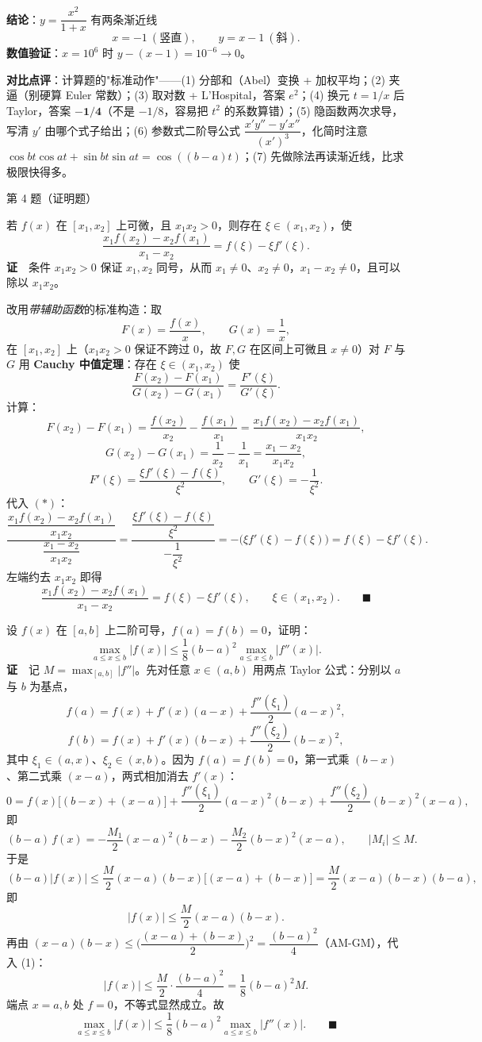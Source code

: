 \documentclass[10pt]{ctexart}
\newcommand{\Qhead}[2]{%
  \begin{tcolorbox}[enhanced,colback=graybg,colframe=acc,
    boxrule=0pt,leftrule=3pt,arc=2pt,top=3pt,bottom=3pt,left=8pt,right=8pt]
  {\heiti\color{acc}#1}\quad #2
  \end{tcolorbox}}
\begin{document}
\noindent\textbf{结论}：$y=\dfrac{x^2}{1+x}$ 有两条渐近线
\[
\boxed{x=-1\ (\text{竖直}),\qquad y=x-1\ (\text{斜}) .}
\]
\textbf{数值验证}：$x=10^6$ 时 $y-(x-1)=10^{-6}\to0$。

\begin{cmpbox}
\textbf{对比点评}：计算题的"标准动作"——(1) 分部和（Abel）变换 + 加权平均；(2) 夹逼（别硬算 Euler 常数）；(3) 取对数 + L'Hospital，答案 $e^2$；(4) 换元 $t=1/x$ 后 Taylor，答案 $\mathbf{-1/4}$（不是 $-1/8$，容易把 $t^2$ 的系数算错）；(5) 隐函数两次求导，写清 $y'$ 由哪个式子给出；(6) 参数式二阶导公式 $\dfrac{x'y''-y'x''}{(x')^3}$，化简时注意 $\cos bt\cos at+\sin bt\sin at=\cos((b-a)t)$；(7) 先做除法再读渐近线，比求极限快得多。
\end{cmpbox}

\Qhead{第 4 题（证明题）}{}

\quad 若 $f(x)$ 在 $[x_1,x_2]$ 上可微，且 $x_1x_2>0$，则存在 $\xi\in(x_1,x_2)$，使
\[
\frac{x_1f(x_2)-x_2f(x_1)}{x_1-x_2}=f(\xi)-\xi f'(\xi).
\]
\textbf{证}　条件 $x_1x_2>0$ 保证 $x_1,x_2$ 同号，从而 $x_1\neq0$、$x_2\neq0$，$x_1-x_2\neq0$，且可以除以 $x_1x_2$。

改用\emph{带辅助函数}的标准构造：取
\[
F(x)=\frac{f(x)}{x},
\qquad
G(x)=\frac1x ,
\]
在 $[x_1,x_2]$ 上（$x_1x_2>0$ 保证不跨过 $0$，故 $F,G$ 在区间上可微且 $x\neq0$）对 $F$ 与 $G$ 用 \textbf{Cauchy 中值定理}：存在 $\xi\in(x_1,x_2)$ 使
\[
\frac{F(x_2)-F(x_1)}{G(x_2)-G(x_1)}=\frac{F'(\xi)}{G'(\xi)} . \tag{$\ast$}
\]
计算：
\[
F(x_2)-F(x_1)=\frac{f(x_2)}{x_2}-\frac{f(x_1)}{x_1}
=\frac{x_1f(x_2)-x_2f(x_1)}{x_1x_2},
\]
\[
G(x_2)-G(x_1)=\frac1{x_2}-\frac1{x_1}=\frac{x_1-x_2}{x_1x_2},
\]
\[
F'(\xi)=\frac{\xi f'(\xi)-f(\xi)}{\xi^{2}},\qquad
G'(\xi)=-\frac1{\xi^{2}} .
\]
代入 $(\ast)$：
\[
\frac{\dfrac{x_1f(x_2)-x_2f(x_1)}{x_1x_2}}{\dfrac{x_1-x_2}{x_1x_2}}
=\frac{\dfrac{\xi f'(\xi)-f(\xi)}{\xi^2}}{-\dfrac{1}{\xi^2}}
=-\big(\xi f'(\xi)-f(\xi)\big)=f(\xi)-\xi f'(\xi) .
\]
左端约去 $x_1x_2$ 即得
\[
\frac{x_1f(x_2)-x_2f(x_1)}{x_1-x_2}=f(\xi)-\xi f'(\xi),
\qquad \xi\in(x_1,x_2). \qquad\blacksquare
\]

\quad 设 $f(x)$ 在 $[a,b]$ 上二阶可导，$f(a)=f(b)=0$，证明：
\[
\max_{a\le x\le b}|f(x)|\le\frac18(b-a)^{2}\max_{a\le x\le b}|f''(x)| .
\]
\textbf{证}　记 $M=\max_{[a,b]}|f''|$。先对任意 $x\in(a,b)$ 用两点 Taylor 公式：分别以 $a$ 与 $b$ 为基点，
\[
f(a)=f(x)+f'(x)(a-x)+\frac{f''(\xi_1)}{2}(a-x)^{2},
\]
\[
f(b)=f(x)+f'(x)(b-x)+\frac{f''(\xi_2)}{2}(b-x)^{2},
\]
其中 $\xi_1\in(a,x)$、$\xi_2\in(x,b)$。因为 $f(a)=f(b)=0$，第一式乘 $(b-x)$、第二式乘 $(x-a)$，两式相加消去 $f'(x)$：
\[
0=f(x)\big[(b-x)+(x-a)\big]+\frac{f''(\xi_1)}{2}(a-x)^{2}(b-x)+\frac{f''(\xi_2)}{2}(b-x)^{2}(x-a),
\]
即
\[
(b-a)\,f(x)
=-\frac{M_1}{2}(x-a)^{2}(b-x)-\frac{M_2}{2}(b-x)^{2}(x-a),\qquad |M_i|\le M .
\]
于是
\[
(b-a)|f(x)|\le\frac{M}{2}(x-a)(b-x)\Big[(x-a)+(b-x)\Big]
=\frac{M}{2}(x-a)(b-x)(b-a),
\]
即
\[
|f(x)|\le\frac{M}{2}(x-a)(b-x). \tag{1}
\]
再由 $(x-a)(b-x)\le\Big(\dfrac{(x-a)+(b-x)}{2}\Big)^{2}=\dfrac{(b-a)^{2}}{4}$（AM-GM），代入 (1)：
\[
|f(x)|\le\frac{M}{2}\cdot\frac{(b-a)^{2}}{4}=\frac18(b-a)^{2}M .
\]
端点 $x=a,b$ 处 $f=0$，不等式显然成立。故
\[
\max_{a\le x\le b}|f(x)|\le\frac18(b-a)^2\max_{a\le x\le b}|f''(x)| . \qquad\blacksquare
\]
\end{document}
